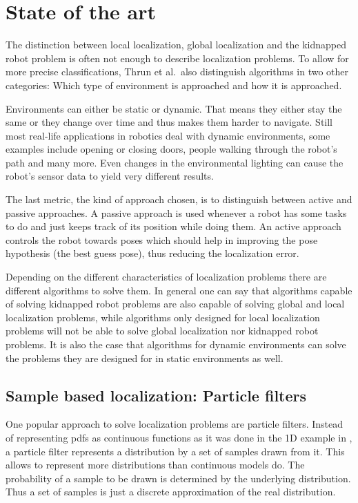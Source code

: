 \documentclass[Thesis.tex]{subfiles}
\begin{document}
\chapter{State of the art}
The distinction between local localization, global localization and the kidnapped robot problem is often not enough to describe localization problems. To allow for more precise classifications, Thrun et al.\ also distinguish algorithms in two other categories: Which type of environment is approached and how it is approached\cite{ThrunBurgardFox:2005}.

Environments can either be static or dynamic. That means they either stay the same or they change over time and thus makes them harder to navigate. Still most real-life applications in robotics deal with dynamic environments, some examples include opening or closing doors, people walking through the robot's path and many more. Even changes in the environmental lighting can cause the robot's sensor data to yield very different results. 

The last metric, the kind of approach chosen, is to distinguish between active and passive approaches. A passive approach is used whenever a robot has some tasks to do and just keeps track of its position while doing them. An active approach controls the robot towards poses which should help in improving the pose hypothesis (the best guess pose), thus reducing the localization error.

Depending on the different characteristics of localization problems there are different algorithms to solve them. In general one can say that algorithms capable of solving kidnapped robot problems are also capable of solving global and local localization problems, while algorithms only designed for local localization problems will not be able to solve global localization nor kidnapped robot problems. It is also the case that algorithms for dynamic environments can solve the problems they are designed for in static environments as well. 

\section{Sample based localization: Particle filters}
One popular approach to solve localization problems are particle filters. Instead of representing \glspl{pdf} as continuous functions as it was done in the 1D example in , a particle filter represents a distribution by a set of samples drawn from it. This allows to represent more distributions than continuous models do\cite{ThrunBurgardFox:2005}. 
The probability of a sample to be drawn is determined by the underlying distribution. Thus a set of samples is just a discrete approximation of the real distribution.
\end{document}
